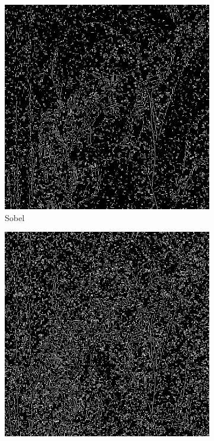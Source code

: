 \documentclass[a4paper]{article}
\begin{document}
\begin{figure}[H]
\centering
	\begin{subfigure}[t]{0.3\textwidth}
	\centering
	\includegraphics[width=\textwidth]{imagenesInforme/lenaHysteresisSaltAndPepperSobel}
	\caption{Sobel}
	\end{subfigure}
	\begin{subfigure}[t]{0.3\textwidth}
	\centering
	\includegraphics[width=\textwidth]{imagenesInforme/lenaHysteresisSaltAndPepperPrewitt}

\end{subfigure}
\end{figure}
\end{document}
